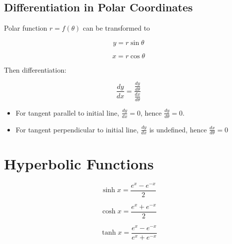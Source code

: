 \documentclass[a4paper,9pt]{scrartcl}
\begin{document}
    \subsection{Differentiation in Polar Coordinates}

    Polar function $r = f(\theta)$ can be transformed to

    \begin{displaymath}
        y = r\sin\theta
    \end{displaymath}

    \begin{displaymath}
        x = r\cos\theta
    \end{displaymath}

    Then differentiation:

    \begin{displaymath}
        \frac{dy}{dx} = \frac{\frac{dy}{d\theta}}{\frac{dx}{d\theta}}
    \end{displaymath}

    \begin{itemize}
        \item For tangent parallel to initial line, $\frac{dy}{dx} = 0$, hence $\frac{dy}{d\theta} = 0$.
        \item For tangent perpendicular to initial line, $\frac{dy}{dx}$ is undefined, hence $\frac{dx}{d\theta} = 0$
    \end{itemize}


    \section{Hyperbolic Functions}
    \begin{displaymath}
        \sinh{x} = \frac{e^x - e^{-x}}{2}
    \end{displaymath}

    \begin{displaymath}
        \cosh{x} = \frac{e^x + e^{-x}}{2}
    \end{displaymath}

    \begin{displaymath}
        \tanh{x} = \frac{e^x - e^{-x}}{e^x + e^{-x}}
    \end{displaymath}

\end{document}
